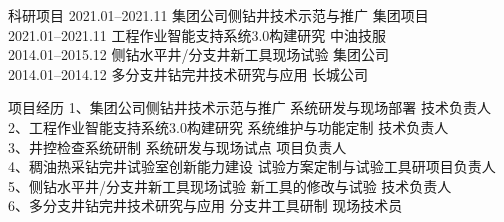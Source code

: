 \documentclass[10pt]{ctexart}
\begin{document}
\begin{mybox}[colbacktitle=MidnightBlue]{科研项目}
2021.01--2021.11		\hfill 	    集团公司侧钻井技术示范与推广             \hfill         集团项目\\
2021.01--2021.11      \hfill     \quad\quad 工程作业智能支持系统3.0构建研究              \hfill     中油技服\\
2014.01--2015.12       \hfill     \quad\quad 侧钻水平井/分支井新工具现场试验               \hfill    集团公司\\
2014.01--2014.12	      \hfill       多分支井钻完井技术研究与应用                   \hfill    长城公司
\end{mybox}
\begin{mybox}[colbacktitle=MidnightBlue]{项目经历}
1、集团公司侧钻井技术示范与推广                  \hspace{75pt} 系统研发与现场部署    \hfill     技术负责人\\  
2、工程作业智能支持系统3.0构建研究                \hspace{55pt}  系统维护与功能定制    \hfill      技术负责人  \\ 
3、井控检查系统研制                               \hspace{135pt}  系统研发与现场试点    \hfill      项目负责人\\
4、稠油热采钻完井试验室创新能力建设               \hspace{56pt}   试验方案定制与试验工具研\hfill   项目负责人      \\
5、侧钻水平井/分支井新工具现场试验              \hspace{62pt}    新工具的修改与试验       \hfill   技术负责人\\
6、多分支井钻完井技术研究与应用               \hspace{76pt}      分支井工具研制           \hfill   现场技术员
\end{mybox}
\end{document}
